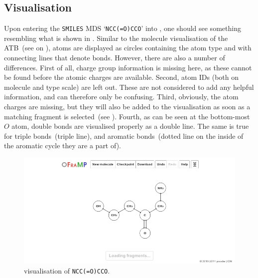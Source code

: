 \subsection{Visualisation}


Upon entering the \verb|SMILES| MDS `\verb|NCC(=O)CCO|' into \oframp, one should see something resembling what is shown in . Similar to the molecule visualisation of the ATB~(see  on ), atoms are displayed as circles containing the atom type and with connecting lines that denote bonds. However, there are also a number of differences. First of all, charge group information is missing here, as these cannot be found before the atomic charges are available. Second, atom IDs (both on molecule and type scale) are left out. These are not considered to add any helpful information, and can therefore only be confusing. Third, obviously, the atom charges are missing, but they will also be added to the visualisation as soon as a matching fragment is selected~(see ). Fourth, as can be seen at the bottom-most $O$ atom, double bonds are visualised properly as a double line. The same is true for triple bonds~(triple line), and aromatic bonds~(dotted line on the inside of the aromatic cycle they are a part of).

\begin{figure}
\center
\includegraphics[width=.9\textwidth]{img/impl_visualising.png}
\caption{\oframp{} visualisation of \texttt{NCC(=O)CCO}.}
\end{figure}

